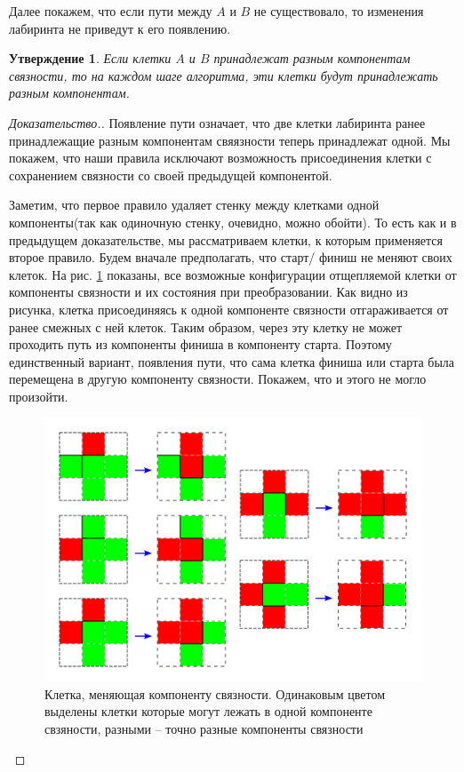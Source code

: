 \documentclass[12pt]{article}
\newtheorem*{claim*}{Утверждение}
\begin{document}
Далее покажем, что если пути между $A$ и $B$ не существовало, то изменения лабиринта не приведут к его появлению.
\begin{claim*}
	Если клетки $A$ и $B$ принадлежат разным компонентам связности, то на каждом шаге алгоритма, эти клетки будут принадлежать разным компонентам.
\end{claim*} 
\begin{proof}[Доказательство.]
	Появление пути означает, что две клетки лабиринта ранее принадлежащие разным компонентам свяязности теперь принадлежат одной. Мы покажем, что наши правила исключают возможность присоединения клетки с сохранением связности со своей предыдущей компонентой.

	Заметим, что первое правило удаляет стенку между клетками одной компоненты(так как одиночную стенку, очевидно, можно обойти). То есть как и в предыдущем доказательстве, мы рассматриваем клетки, к которым применяется второе правило. Будем вначале предполагать, что старт/ финиш не меняют своих клеток. На рис. \ref{fig:split} показаны, все возможные конфигурации отщепляемой клетки от компоненты связности и их состояния при преобразовании. Как видно из рисунка, клетка присоединяясь к одной компоненте связности отгараживается от ранее смежных с ней клеток. Таким образом, через эту клетку не может проходить путь из компоненты финиша в компоненту старта. Поэтому единственный вариант, появления пути, что сама клетка финиша или старта была перемещена в другую компоненту связности. Покажем, что и этого не могло произойти.
	
	\begin{figure}[H]
	 	  \centering
          \includegraphics[width=0.8\linewidth]{split}
          \caption{Клетка, меняющая компоненту связности. Одинаковым цветом выделены клетки которые могут лежать в одной компоненте свзяности, разными -- точно разные компоненты связности}
         \label{fig:split}
     \end{figure}
     

\end{proof}
\end{document}
